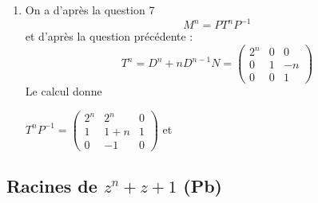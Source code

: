 \begin{correction}
\begin{enumerate}
\item On a d'après la question 7 
$$M^n = P T^n P^{-1}$$
et d'après la question précédente : 
$$T^n = D^{n} + n D^{n-1} N  =\left(\begin{array}{ccc}  
2^n&0&0 \\
0 &1&-n \\
0&0&1 
\end{array}\right)$$
Le calcul donne 

$T^n P^{-1} = \left(\begin{array}{ccc}  
2^n&2^n&0 \\
1 &1+n&1 \\
0&-1&0 
\end{array}\right)$
et 




\end{enumerate}
\end{correction}





\subsection{Racines de $z^n+z+1$ (Pb)}

